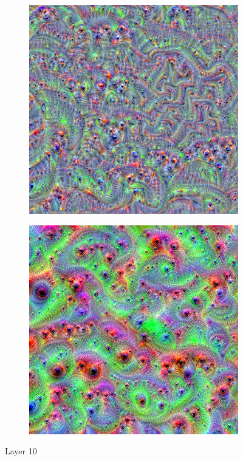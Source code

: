 \begin{figure}
    \captionsetup{justification=centering}
    
    \begin{subfigure}[t]{0.48\textwidth}
        \captionsetup{justification=centering}
        \centering
        \includegraphics[width=.7\linewidth]{figuras/feat_vis/experiments/final/l10/random_image_pl4_lr4e-2_layer21_no-blur.png}
        \caption{}
    \end{subfigure}
    \hfill
    \begin{subfigure}[t]{0.48\textwidth}
        \captionsetup{justification=centering}
        \centering
        \includegraphics[width=.7\linewidth]{figuras/feat_vis/experiments/final/l10/random_image_pl4_lr4e-1_layer21.png}
        \caption{}
    \end{subfigure}
    
    \caption{Layer 10}
    
\end{figure}

